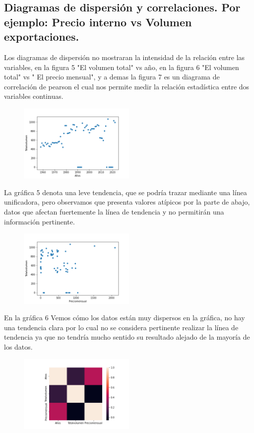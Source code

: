 \documentclass[11pt,letterpaper,twocolumn]{article}
\begin{document}
\subsection{Diagramas de dispersión y correlaciones. Por ejemplo: Precio interno vs Volumen exportaciones.}
Los diagramas de dispersión no mostraran la intensidad de la relación entre las  variables, en la figura 5 "El volumen total" vs año,  en la figura 6 "El volumen total" vs " El precio mensual",  y a demas la figura 7 es un diagrama de correlación de pearson el cual nos permite medir la relación estadística entre dos variables continuas.
\begin{figure}[H]
            \centering
            \includegraphics[width=0.5\textwidth]{imagenes/punto5_1.png}
            \caption{\label{fig5:frog}}
        \end{figure}
La gráfica 5 denota una leve tendencia, que se podría trazar mediante una línea unificadora, pero observamos que presenta valores atípicos por la parte de abajo, datos que afectan fuertemente la línea de tendencia y no permitirán una información pertinente.
\begin{figure}[H]
            \centering
            \includegraphics[width=0.5\textwidth]{imagenes/punto5_2.png}
            \caption{\label{fig6:frog}}
        \end{figure}
En la gráfica 6 Vemos cómo los datos están muy dispersos en la gráfica, no hay una tendencia clara por lo cual no se considera pertinente realizar la línea de tendencia ya que no tendría mucho sentido su resultado alejado de la mayoría de los datos.
\begin{figure}[H]
            \centering
            \includegraphics[width=0.5\textwidth]{imagenes/punto5_3.png}
            \caption{\label{fig7:frog}}
        \end{figure}
\end{document}
